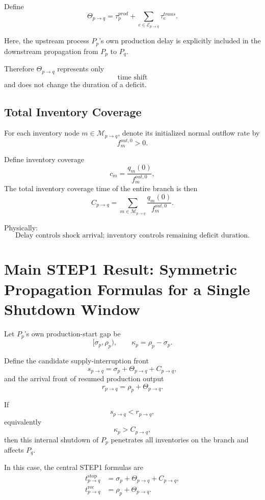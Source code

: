 \documentclass[11pt]{article}
\begin{document}
Define
\[
\boxed{
\Theta_{p\to q}
=
\tau_p^{prod}
+
\sum_{e\in\mathcal E_{p\to q}}
\tau_e^{trans}.
}
\tag{1}
\]

Here, the upstream process \(P_p\)'s own production delay is explicitly included in
the downstream propagation from \(P_p\) to \(P_q\).

Therefore \(\Theta_{p\to q}\) represents only
\[
\boxed{\text{time shift}}
\]
and does not change the duration of a deficit.

\subsection{Total Inventory Coverage}

For each inventory node \(m\in\mathcal M_{p\to q}\),
denote its initialized normal outflow rate by
\[
f_m^{out,0}>0.
\]

Define inventory coverage
\[
c_m=\frac{q_m(0)}{f_m^{out,0}},
\]
The total inventory coverage time of the entire branch is then
\[
\boxed{
C_{p\to q}
=
\sum_{m\in\mathcal M_{p\to q}}
\frac{q_m(0)}{f_m^{out,0}}.
}
\tag{2}
\]

Physically:
\[
\boxed{
\text{Delay controls shock arrival; inventory controls remaining deficit duration.}
}
\]

\section{Main STEP1 Result: Symmetric Propagation Formulas for a Single Shutdown Window}

Let \(P_p\)'s own production-start gap be
\[
[\sigma_p,\rho_p),
\qquad
\kappa_p=\rho_p-\sigma_p.
\]

Define the candidate supply-interruption front
\[
\boxed{
s_{p\to q}
=
\sigma_p+\Theta_{p\to q}+C_{p\to q},
}
\tag{3}
\]
and the arrival front of resumed production output
\[
\boxed{
r_{p\to q}
=
\rho_p+\Theta_{p\to q}.
}
\tag{4}
\]

If
\[
s_{p\to q}<r_{p\to q},
\]
equivalently
\[
\boxed{
\kappa_p>C_{p\to q},
}
\tag{5}
\]
then this internal shutdown of \(P_p\) penetrates all inventories on the branch and affects \(P_q\).

In this case, the central STEP1 formulas are
\[
\boxed{
\begin{aligned}
t_{p\to q}^{\mathrm{stop}}
&=
\sigma_p
+\Theta_{p\to q}
+C_{p\to q},
\\[1mm]
t_{p\to q}^{\mathrm{rec}}
&=
\rho_p
+\Theta_{p\to q}.
\end{aligned}
}
\tag{6}
\]
\end{document}
